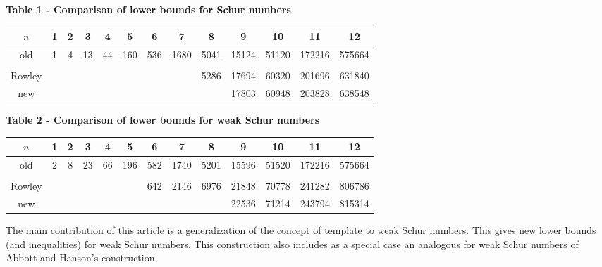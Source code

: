 \begin{center}

\textbf{Table 1 - Comparison of lower bounds for Schur numbers}

\begin{tabular}{|*{13}{c|}}
    \hline
    \(n\) & 1 & 2 & 3 & 4 & 5 & 6 & 7 & 8 & 9 & 10 & 11 & 12 \\
    \hline
    old & 1 & 4 & 13 & 44 & 160 & 536 & 1680 & 5041 & 15124 & 51120 & 172216 & 575664 \\
      & & & & & \cite{Heule2017} & \cite{Fredricksen} & \cite{Fredricksen} & \cite{ELIAHOU2012175} & 
    \cite{ELIAHOU2012175} & \cite{AbbottHanson} & \cite{AbbottHanson} & \cite{AbbottHanson} \\
    \hline
    Rowley & & & & & & & & 5286 & 17694 & 60320 & 201696 & 631840 \\
    \hline
    new & & & & & & & & & 17803 & 60948 & 203828 & 638548 \\
    \hline
\end{tabular}

\vspace{3ex}
\textbf{Table 2 - Comparison of lower bounds for weak Schur numbers}

\begin{tabular}{|*{13}{c|}}
    \hline
    \(n\) & 1 & 2 & 3 & 4 & 5 & 6 & 7 & 8 & 9 & 10 & 11 & 12 \\
    \hline
    old & 2 & 8 & 23 & 66 & 196 & 582 & 1740 & 5201 & 15596 & 51520 & 172216 & 575664 \\
      & & & & & \cite{ELIAHOU2012175} &\cite{EliahouBook} & \cite{Rafilipojaona} & \cite{Rafilipojaona} & 
    \cite{Rafilipojaona} & \cite{AbbottHanson} & \cite{AbbottHanson} & \cite{AbbottHanson} \\
    \hline
    Rowley & & & & & & 642 & 2146 & 6976 & 21848 & 70778 & 241282 & 806786 \\
    \hline
    new & & & & & & & & & 22536 & 71214 & 243794 & 815314 \\
    \hline
\end{tabular}

\end{center}

\par The main contribution of this article is a generalization of the concept of template to weak Schur numbers. 
This gives new lower bounds (and inequalities) for weak Schur numbers. This construction also includes as a 
special case an analogous for weak Schur numbers of Abbott and Hanson's construction.

